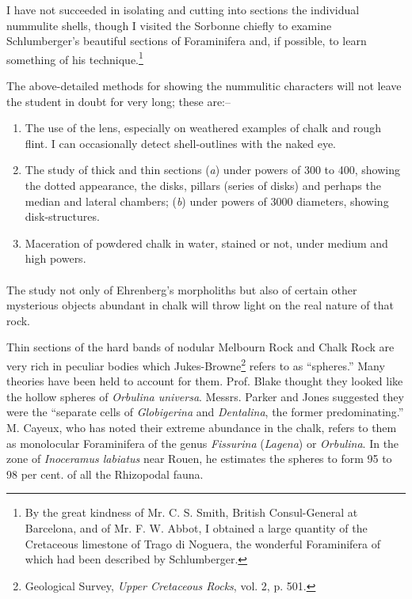 \documentclass[a4paper, 12pt, oneside]{article}
\begin{document}
I have not succeeded in isolating and cutting into sections the individual nummulite shells, though I visited the Sorbonne chiefly to examine Schlumberger's beautiful sections of Foraminifera and, if possible, to learn something of his technique.\footnote{By the great kindness of Mr. C. S. Smith, British Consul-General at Barcelona, and of Mr. F. W. Abbot, I obtained a large quantity of the Cretaceous limestone of Trago di Noguera, the wonderful Foraminifera of which had been described by Schlumberger.}

The above-detailed methods for showing the nummulitic characters will not leave the student in doubt for very long; these are:--
\begin{enumerate}
\item The use of the lens, especially on weathered examples of chalk and rough flint. I can occasionally detect shell-outlines with the naked eye.

\item The study of thick and thin sections (\emph{a}) under powers of 300 to 400, showing the dotted appearance, the disks, pillars (series of disks) and perhaps the median and lateral chambers; (\emph{b}) under powers of 3000 diameters, showing disk-structures.

\item Maceration of powdered chalk in water, stained or not, under medium and high powers.
\end{enumerate}
\paragraph{}
The study not only of Ehrenberg's morpholiths but also of certain other mysterious objects abundant in chalk will throw light on the real nature of that rock.

Thin sections of the hard bands of nodular Melbourn Rock and Chalk Rock are very rich in peculiar bodies which Jukes-Browne\footnote{Geological Survey, \emph{Upper Cretaceous Rocks}, vol. 2, p. 501.} refers to as ``spheres.'' Many theories have been held to account for them. Prof. Blake thought they looked like the hollow spheres of \emph{Orbulina universa}. Messrs. Parker and Jones suggested they were the ``separate cells of \emph{Globigerina} and \emph{Dentalina}, the former predominating.'' M. Cayeux, who has noted their extreme abundance in the chalk, refers to them as monolocular Foraminifera of the genus \emph{Fissurina} (\emph{Lagena}) or \emph{Orbulina}. In the zone of \emph{Inoceramus labiatus} near Rouen, he estimates the spheres to form 95 to 98 per cent. of all the Rhizopodal fauna.
\end{document}
